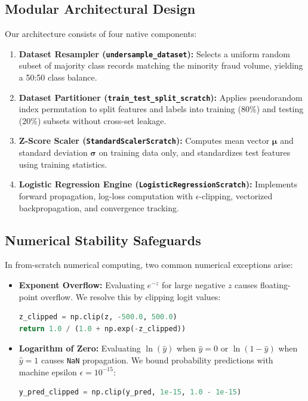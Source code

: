 \documentclass[11pt,a4paper]{article}
\begin{document}
\subsection{Modular Architectural Design}
Our architecture consists of four native components:
\begin{enumerate}
    \item \textbf{Dataset Resampler (\texttt{undersample\_dataset}):} Selects a uniform random subset of majority class records matching the minority fraud volume, yielding a 50:50 class balance.
    \item \textbf{Dataset Partitioner (\texttt{train\_test\_split\_scratch}):} Applies pseudorandom index permutation to split features and labels into training ($80\%$) and testing ($20\%$) subsets without cross-set leakage.
    \item \textbf{Z-Score Scaler (\texttt{StandardScalerScratch}):} Computes mean vector $\boldsymbol{\mu}$ and standard deviation $\boldsymbol{\sigma}$ on training data only, and standardizes test features using training statistics.
    \item \textbf{Logistic Regression Engine (\texttt{LogisticRegressionScratch}):} Implements forward propagation, log-loss computation with $\epsilon$-clipping, vectorized backpropagation, and convergence tracking.
\end{enumerate}

\subsection{Numerical Stability Safeguards}
In from-scratch numerical computing, two common numerical exceptions arise:
\begin{itemize}
    \item \textbf{Exponent Overflow:} Evaluating $e^{-z}$ for large negative $z$ causes floating-point overflow. We resolve this by clipping logit values:
    \begin{lstlisting}[language=Python]
z_clipped = np.clip(z, -500.0, 500.0)
return 1.0 / (1.0 + np.exp(-z_clipped))
    \end{lstlisting}
    \item \textbf{Logarithm of Zero:} Evaluating $\ln(\hat{y})$ when $\hat{y} = 0$ or $\ln(1 - \hat{y})$ when $\hat{y} = 1$ causes \texttt{NaN} propagation. We bound probability predictions with machine epsilon $\epsilon = 10^{-15}$:
    \begin{lstlisting}[language=Python]
y_pred_clipped = np.clip(y_pred, 1e-15, 1.0 - 1e-15)
    \end{lstlisting}
\end{itemize}
\end{document}
